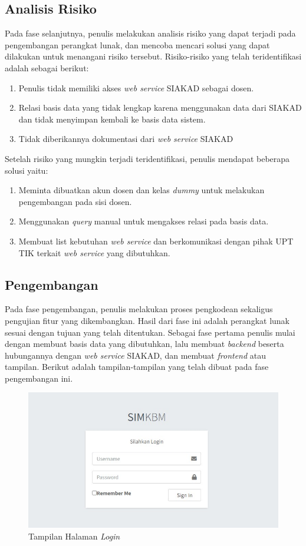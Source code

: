 \subsection{Analisis Risiko}
	Pada fase selanjutnya, penulis melakukan analisis risiko yang dapat terjadi pada pengembangan perangkat lunak, dan mencoba mencari solusi yang dapat dilakukan untuk menangani risiko tersebut. Risiko-risiko yang telah teridentifikasi adalah sebagai berikut:
\begin{enumerate}
	\item Penulis tidak memiliki akses \textit{web service} SIAKAD sebagai dosen. 
	\item Relasi basis data yang tidak lengkap karena menggunakan data dari SIAKAD dan tidak menyimpan kembali ke basis data sistem.
	\item Tidak diberikannya dokumentasi dari \textit{web service} SIAKAD
\end{enumerate}
Setelah risiko yang mungkin terjadi teridentifikasi, penulis mendapat beberapa solusi yaitu:
\begin{enumerate}
	\item Meminta dibuatkan akun dosen dan kelas \textit{dummy} untuk melakukan pengembangan pada sisi dosen.
	\item Menggunakan \textit{query} manual untuk mengakses relasi pada basis data.
	\item Membuat list kebutuhan \textit{web service} dan berkomunikasi dengan pihak UPT TIK terkait \textit{web service} yang dibutuhkan.
\end{enumerate}

\subsection{Pengembangan}
	Pada fase pengembangan, penulis melakukan proses pengkodean sekaligus pengujian fitur yang dikembangkan. Hasil dari fase ini adalah perangkat lunak sesuai dengan tujuan yang telah ditentukan. Sebagai fase pertama penulis mulai dengan membuat basis data yang dibutuhkan, lalu membuat \textit{backend} beserta hubungannya dengan \textit{web service} SIAKAD, dan membuat \textit{frontend} atau tampilan. Berikut adalah tampilan-tampilan yang telah dibuat pada fase pengembangan ini.

\begin{figure}[h!]
	\centering
	\includegraphics[width=1\textwidth]{gambar/ss/login}
	\caption{Tampilan Halaman \textit{Login}}
	\label{fig:sslogin}
\end{figure}

